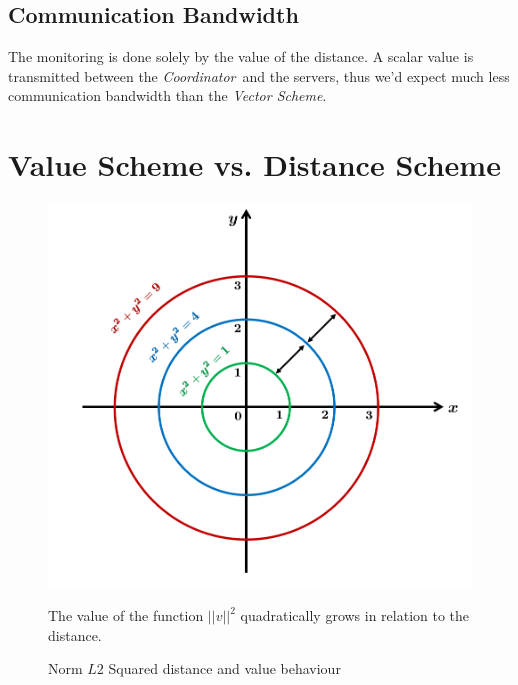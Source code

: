\documentclass[10pt, conference]{IEEEtran}
\newcommand{\vectorScheme}{\textit{Vector Scheme}}
\newcommand{\Coordinator}{\textit{Coordinator}}
\begin{document}
\subsection{Communication Bandwidth}
The monitoring is done solely by the value of the distance. A scalar value is transmitted between the \Coordinator \ and the servers, thus we'd expect much less communication bandwidth than the \vectorScheme .

\section{Value Scheme vs. Distance Scheme}

\begin{figure}[t]
\begin{center}
\includegraphics[width=\linewidth]{Pics/PNGs/L2NormDistanceVsValue.png}
\end{center}
\caption{Norm $L2$ Squared distance and value behaviour}
\label{fig:L2NormDistanceVsValue}
\medskip
\small
The value of the function $||v||^2$ quadratically grows in relation to the distance.
\end{figure}
\end{document}
